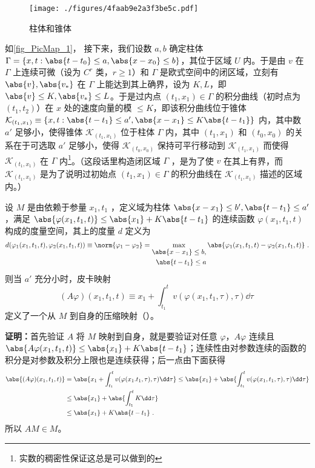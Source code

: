 \begin{figure}[ht]
\centering
\texttt{[image: ./figures/4faab9e2a3f3be5c.pdf]}
\caption{柱体和锥体} \label{fig_PicMap_1}
\end{figure}
如\autoref{fig_PicMap_1}， 接下来，我们设数 $a,b$ 确定柱体 $\Gamma=\{x,t:\abs{t-t_0}\leq a,\abs{x-x_0}\leq b\}$，其位于区域 $U$ 内。于是由 $v$ 在 $\Gamma$ 上连续可微（设为 $C^r$ 类，$r\geq1$）和 $\Gamma$ 是欧式空间中的闭区域，立刻有 $\abs{v},\abs{v_*}$ 在 $\Gamma$ 上能达到其上确界，设为 $K,L$，即 $\abs{v}\leq K,\abs{v_*}\leq L$。于是过内点 $(t_1,x_1)\in\Gamma$ 的积分曲线（初时点为 $(t_1,t_2)$）在 $x$ 处的速度向量的模 $\leq K$，即该积分曲线位于锥体 $\mathcal K_{(t_1,x_1)}\equiv\{x,t:\abs{t-t_1}\leq a',\abs{x-x_1}\leq K\abs{t-t_1}\}$ 内，其中数 $a'$ 足够小，使得锥体 $\mathcal K_{(t_1,x_1)}$ 位于柱体 $\Gamma$ 内，其中 $(t_1,x_1)$ 和 $(t_0,x_0)$ 的关系在于可选取 $a'$ 足够小，使得 $\mathcal K_{(t_0,x_0)}$ 保持可平行移动到 $\mathcal K_{(t_1,x_1)}$ 而使得 $\mathcal K_{(t_1,x_1)}$ 在 $\Gamma$ 内\footnote{实数的稠密性保证这总是可以做到的}。（这段话里构造闭区域 $\Gamma$ ，是为了使 $v$ 在其上有界，而 $\mathcal K_{(t_1,x_1)}$ 是为了说明过初始点 $(t_1,x_1)\in\Gamma$ 的积分曲线在 $\mathcal K_{(t_1,x_1)}$ 描述的区域内。）

\begin{theorem}{}\label{the_PicMap_2}
设 $M$ 是由依赖于参量 $x_1,t_1$ ，定义域为柱体 $\abs{x-x_1}\leq b',\abs{t-t_1}\leq a'$，满足 $\abs{\varphi(x_1,t_1,t)}\leq \abs{x_1}+K\abs{t-t_1}$ 的连续函数 $\varphi(x_1,t_1,t)$ 构成的度量空间，其上的度量 $d$ 定义为
\begin{equation}
d(\varphi_1(x_1,t_1,t),\varphi_2(x_1,t_1,t))\equiv\norm{\varphi_1-\varphi_2}=\max_{\begin{aligned}\abs{x-x_1}\leq b,\\\abs{t-t_1}\leq a\end{aligned}}\abs{\varphi_1(x_1,t_1,t)-\varphi_2(x_1,t_1,t)}~.
\end{equation}
则当 $a'$ 充分小时，皮卡映射
\begin{equation}
(A\varphi)(x_1,t_1,t)\equiv x_1+\int_{t_1}^{t}v(\varphi(x_1,t_1,\tau),\tau)\dd \tau~
\end{equation}
定义了一个从 $M$ 到自身的压缩映射（）。
\end{theorem}
\textbf{证明：}首先验证 $A$ 将 $M$ 映射到自身，就是要验证对任意 $\varphi$，$A\varphi$ 连续且 $\abs{A\varphi(x_1,t_1,t)}\leq \abs{x_1}+K\abs{t-t_1}$；连续性由对参数连续的函数的积分是对参数及积分上限也是连续获得；后一点由下面获得
\begin{equation}
\begin{aligned}
\abs{(A\varphi)(x_1,t_1,t)}&=\abs{x_1+\int_{t_1}^t v(\varphi(x_1.t_1,\tau),\tau)\dd \tau}\leq\abs{x_1}+\abs{\int_{t_1}^t v(\varphi(x_1,t_1,\tau),\tau)\dd \tau}\\
&\leq\abs{x_1}+\abs{\int_{t_1}^t K\dd \tau}\\
&\leq\abs{x_1}+K\abs{t-t_1}~.
\end{aligned}
\end{equation}
所以 $AM\in M$。

